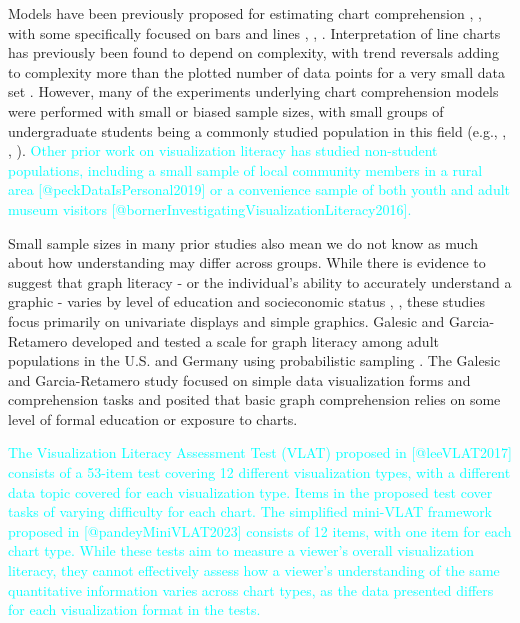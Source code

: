 \documentclass{IEEEcsmag}
\begin{document}
Models have been previously proposed for estimating chart comprehension , , with some specifically focused on bars and lines , , . Interpretation of line charts has previously been found to depend on complexity, with trend reversals adding to complexity more than the plotted number of data points for a very small data set . However, many of the experiments underlying chart comprehension models were performed with small or biased sample sizes, with small groups of undergraduate students being a commonly studied population in this field (e.g., , , ). \textcolor{cyan}{Other prior work on visualization literacy has studied non-student populations, including a small sample of local community members in a rural area [@peckDataIsPersonal2019] or a convenience sample of both youth and adult museum visitors [@bornerInvestigatingVisualizationLiteracy2016].}

Small sample sizes in many prior studies also mean we do not know as much about how understanding may differ across groups. While there is evidence to suggest that graph literacy - or the individual's ability to accurately understand a graphic - varies by level of education and socieconomic status , , these studies focus primarily on univariate displays and simple graphics. Galesic and Garcia-Retamero developed and tested a scale for graph literacy among adult populations in the U.S. and Germany using probabilistic sampling . The Galesic and Garcia-Retamero study focused on simple data visualization forms and comprehension tasks and posited that basic graph comprehension relies on some level of formal education or exposure to charts.

\textcolor{cyan}{The Visualization Literacy Assessment Test (VLAT) proposed in [@leeVLAT2017] consists of a 53-item test covering 12 different visualization types, with a different data topic covered for each visualization type. Items in the proposed test cover tasks of varying difficulty for each chart. The simplified mini-VLAT framework proposed in [@pandeyMiniVLAT2023] consists of 12 items, with one item for each chart type. While these tests aim to measure a viewer's overall visualization literacy, they cannot effectively assess how a viewer's understanding of the same quantitative information varies across chart types, as the data presented differs for each visualization format in the tests. }
\end{document}
